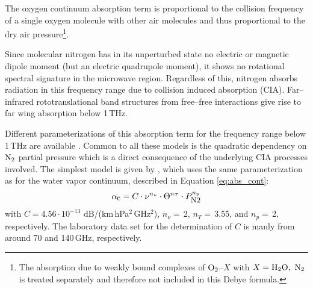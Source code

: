 {The oxygen continuum absorption term is proportional to 
the collision frequency of a single oxygen molecule with other air molecules 
and thus proportional to the dry air pressure\footnote{The absorption
  due to weakly bound complexes of $\mbox{O}_2$--$X$ with $X=\mbox{H}_2\mbox{O},~\mbox{N}_2$ is 
  treated separately and therefore not included in this Debye formula.}.




\label{levelc:n2cont}
Since molecular nitrogen has in its unperturbed state no electric or 
magnetic dipole moment (but an electric quadrupole moment), it shows 
no rotational spectral signature in the microwave region. Regardless 
of this, nitrogen absorbs radiation in this frequency range due to 
collision induced absorption (CIA). Far--infrared rototranslational
band structures from free--free interactions give rise to far wing
absorption below 1\,THz.

Different parameterizations of this absorption term for the 
frequency range below 1\,THz are available 
\citet{pwr:93,liebeetal:93,borysow:86}. Common to all these 
models is the quadratic dependency on $\mbox{N}_2$ partial pressure which is 
a direct consequence of the underlying CIA processes involved.
The simplest model is given by \citet{pwr:93}, which uses 
the same parameterization as for the water vapor continuum, described 
in Equation \ref{eq:abs_cont}:
\begin{equation}
  \label{eq:abs_cont_pwr_n2}
    \alpha_{\mbox{\small c}} =  C \cdot \nu^{n_{\nu}} \cdot \Theta^{n_T} \cdot P_{\mbox{\rm \small N2}}^{n_p}
\end{equation}
with $C = 4.56\cdot 10^{-13}$ dB/(km\,hPa$^2$\,GHz$^2$), $n_{\nu}=$\,2, 
$n_T=$\,3.55, and $n_p=$\,2, respectively. The laboratory data set 
for the determination of $C$ is manly from \citet{dagg:75,dagg:78} 
around 70 and 140\,GHz, respectively.

}
